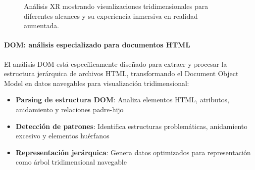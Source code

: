 \documentclass[a4paper, 12pt]{book}
\begin{document}
\begin{figure}[H]
\begin{minipage}[b]{0.32\textwidth}
\end{minipage}
\caption{Análisis XR mostrando visualizaciones tridimensionales para diferentes alcances y su experiencia inmersiva en realidad aumentada.}
\label{fig:xr-analisis}
\end{figure}

\paragraph{DOM: análisis especializado para documentos HTML}
El análisis DOM está específicamente diseñado para extraer y procesar la estructura jerárquica de archivos HTML, transformando el Document Object Model en datos navegables para visualización tridimensional:

\begin{itemize}
  \item \textbf{Parsing de estructura DOM}: Analiza elementos HTML, atributos, anidamiento y relaciones padre-hijo
  \item \textbf{Detección de patrones}: Identifica estructuras problemáticas, anidamiento excesivo y elementos huérfanos
  \item \textbf{Representación jerárquica}: Genera datos optimizados para representación como árbol tridimensional navegable
\end{itemize}
\end{document}
